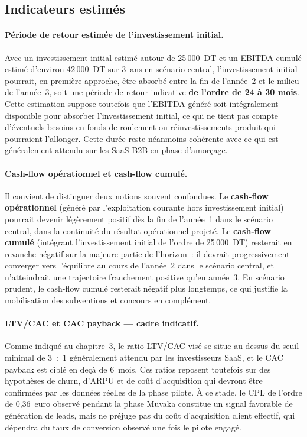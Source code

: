 \subsection{Indicateurs estimés}
\label{subsec:indicateurs_estimes}

\paragraph{Période de retour estimée de l'investissement initial.} Avec un investissement initial estimé autour de 25\,000~DT et un EBITDA cumulé estimé d'environ 42\,000~DT sur 3~ans en scénario central, l'investissement initial pourrait, en première approche, être absorbé entre la fin de l'année~2 et le milieu de l'année~3, soit une période de retour indicative \textbf{de l'ordre de 24 à 30 mois}. Cette estimation suppose toutefois que l'EBITDA généré soit intégralement disponible pour absorber l'investissement initial, ce qui ne tient pas compte d'éventuels besoins en fonds de roulement ou réinvestissements produit qui pourraient l'allonger. Cette durée reste néanmoins cohérente avec ce qui est généralement attendu sur les SaaS B2B en phase d'amorçage.

\paragraph{Cash-flow opérationnel et cash-flow cumulé.} Il convient de distinguer deux notions souvent confondues. Le \textbf{cash-flow opérationnel} (généré par l'exploitation courante hors investissement initial) pourrait devenir légèrement positif dès la fin de l'année~1 dans le scénario central, dans la continuité du résultat opérationnel projeté. Le \textbf{cash-flow cumulé} (intégrant l'investissement initial de l'ordre de 25\,000~DT) resterait en revanche négatif sur la majeure partie de l'horizon~: il devrait progressivement converger vers l'équilibre au cours de l'année~2 dans le scénario central, et n'atteindrait une trajectoire franchement positive qu'en année~3. En scénario prudent, le cash-flow cumulé resterait négatif plus longtemps, ce qui justifie la mobilisation des subventions et concours en complément.

\paragraph{LTV/CAC et CAC payback — cadre indicatif.} Comme indiqué au chapitre~3, le ratio LTV/CAC visé se situe au-dessus du seuil minimal de 3~:~1 généralement attendu par les investisseurs SaaS, et le CAC payback est ciblé en deçà de 6~mois. Ces ratios reposent toutefois sur des hypothèses de churn, d'ARPU et de coût d'acquisition qui devront être confirmées par les données réelles de la phase pilote. À ce stade, le CPL de l'ordre de 0{,}36~euro observé pendant la phase Muvaka constitue un signal favorable de génération de leads, mais ne préjuge pas du coût d'acquisition client effectif, qui dépendra du taux de conversion observé une fois le pilote engagé.

